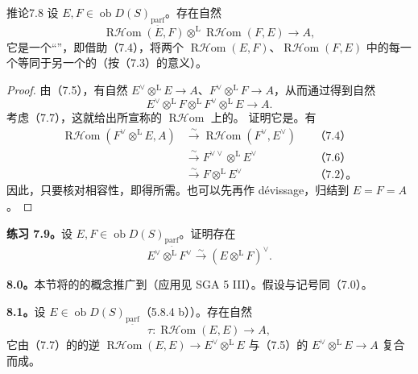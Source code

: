 \begin{SGAresult}{推论}{7.8}
设 $E,F\in\operatorname{ob}D(S)_{\underline{\mathrm{parf}}}$。存在自然
\[\operatorname{R\mathcal Hom}(E,F)\otimes^{\mathrm L}\operatorname{R\mathcal Hom}(F,E)\longrightarrow A,\]
它是一个“”，即借助（7.4），将两个 $\operatorname{R\mathcal Hom}(E,F)$、$\operatorname{R\mathcal Hom}(F,E)$ 中的每一个等同于另一个的（按（7.3）的意义）。
\end{SGAresult}
\begin{proof}
由（7.5），有自然 $E^\vee\otimes^{\mathrm L}E\to A$、$F^\vee\otimes^{\mathrm L}F\to A$，从而通过得到自然
\[E^\vee\otimes^{\mathrm L}F\otimes^{\mathrm L}F^\vee\otimes^{\mathrm L}E\longrightarrow A.\]
考虑（7.7），这就给出所宣称的 $\operatorname{R\mathcal Hom}$ 上的。
证明它是。有
\[\begin{aligned}
\operatorname{R\mathcal Hom}(F^\vee\otimes^{\mathrm L}E,A)&\xrightarrow{\sim}\operatorname{R\mathcal Hom}(F^\vee,E^\vee)&&\text{（7.4）}\\
&\xrightarrow{\sim}F^{\vee\vee}\otimes^{\mathrm L}E^\vee&&\text{（7.6）}\\
&\xrightarrow{\sim}F\otimes^{\mathrm L}E^\vee&&\text{（7.2）。}
\end{aligned}\]
因此，只要核对相容性，即得所需。也可以先再作 dévissage，归结到 $E=F=A$。
\end{proof}

\textbf{练习 7.9。}设 $E,F\in\operatorname{ob}D(S)_{\underline{\mathrm{parf}}}$。证明存在
\[E^\vee\otimes^{\mathrm L}F^\vee\xrightarrow{\sim}(E\otimes^{\mathrm L}F)^\vee.\]

\textbf{8.0。}本节将的的概念推广到（应用见 SGA 5 III）。假设与记号同（7.0）。

\textbf{8.1。}设 $E\in\operatorname{ob}D(S)_{\underline{\mathrm{parf}}}$（5.8.4 b））。存在自然
\[\tau:\operatorname{R\mathcal Hom}(E,E)\longrightarrow A,\]
它由（7.7）的的逆 $\operatorname{R\mathcal Hom}(E,E)\to E^\vee\otimes^{\mathrm L}E$ 与（7.5）的 $E^\vee\otimes^{\mathrm L}E\to A$ 复合而成。

